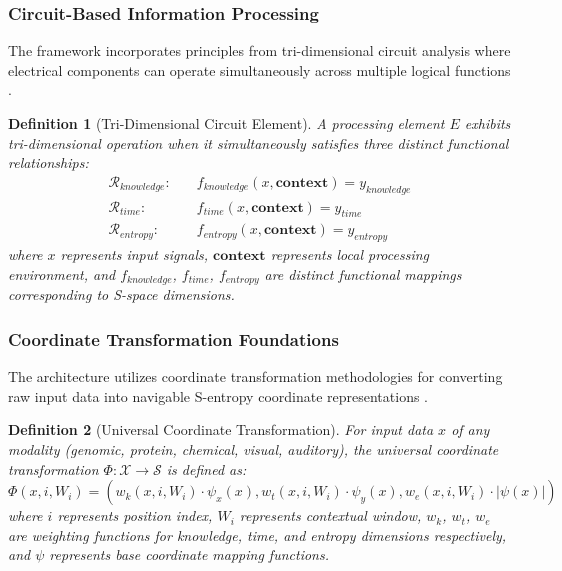 \documentclass[12pt,a4paper]{article}
\newtheorem{definition}{Definition}
\begin{document}
\subsubsection{Circuit-Based Information Processing}

The framework incorporates principles from tri-dimensional circuit analysis where electrical components can operate simultaneously across multiple logical functions \cite{sachikonye2024circuits}.

\begin{definition}[Tri-Dimensional Circuit Element]
A processing element $E$ exhibits tri-dimensional operation when it simultaneously satisfies three distinct functional relationships:
\begin{align}
\mathcal{R}_{knowledge}: \quad &f_{knowledge}(x, \mathbf{context}) = y_{knowledge} \\
\mathcal{R}_{time}: \quad &f_{time}(x, \mathbf{context}) = y_{time} \\
\mathcal{R}_{entropy}: \quad &f_{entropy}(x, \mathbf{context}) = y_{entropy}
\end{align}
where $x$ represents input signals, $\mathbf{context}$ represents local processing environment, and $f_{knowledge}$, $f_{time}$, $f_{entropy}$ are distinct functional mappings corresponding to S-space dimensions.
\end{definition}

\subsubsection{Coordinate Transformation Foundations}

The architecture utilizes coordinate transformation methodologies for converting raw input data into navigable S-entropy coordinate representations \cite{sachikonye2024molecular}.

\begin{definition}[Universal Coordinate Transformation]
For input data $x$ of any modality (genomic, protein, chemical, visual, auditory), the universal coordinate transformation $\Phi: \mathcal{X} \rightarrow \mathcal{S}$ is defined as:
\begin{equation}
\Phi(x, i, W_i) = (w_k(x,i,W_i) \cdot \psi_x(x), w_t(x,i,W_i) \cdot \psi_y(x), w_e(x,i,W_i) \cdot |\psi(x)|)
\end{equation}
where $i$ represents position index, $W_i$ represents contextual window, $w_k$, $w_t$, $w_e$ are weighting functions for knowledge, time, and entropy dimensions respectively, and $\psi$ represents base coordinate mapping functions.
\end{definition}
\end{document}
